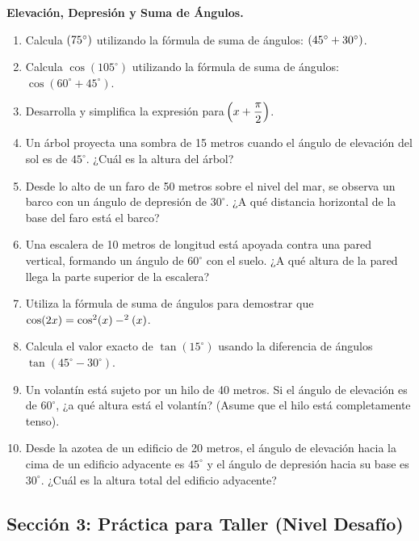 \documentclass[letterpaper, 12pt]{article}
\let\sin\relax
\DeclareMathOperator{\sin}{sen}
\begin{document}
\vspace{0.5cm}

\textbf{Elevación, Depresión y Suma de Ángulos.}
\begin{enumerate}[label=\textbf{\arabic*.}, leftmargin=*, itemsep=0.4cm, start=31]
    \item Calcula $\sin(75^\circ)$ utilizando la fórmula de suma de ángulos: $\sin(45^\circ + 30^\circ)$.
    \item Calcula $\cos(105^\circ)$ utilizando la fórmula de suma de ángulos: $\cos(60^\circ + 45^\circ)$.
    \item Desarrolla y simplifica la expresión para $\sin\!\left(x + \dfrac{\pi}{2}\right)$.
    \item Un árbol proyecta una sombra de 15 metros cuando el ángulo de elevación del sol es de $45^\circ$. ¿Cuál es la altura del árbol?
    \item Desde lo alto de un faro de 50 metros sobre el nivel del mar, se observa un barco con un ángulo de depresión de $30^\circ$. ¿A qué distancia horizontal de la base del faro está el barco?
    \item Una escalera de 10 metros de longitud está apoyada contra una pared vertical, formando un ángulo de $60^\circ$ con el suelo. ¿A qué altura de la pared llega la parte superior de la escalera?
    \item Utiliza la fórmula de suma de ángulos para demostrar que $\cos(2x) = \cos^2(x) - \sin^2(x)$.
    \item Calcula el valor exacto de $\tan(15^\circ)$ usando la diferencia de ángulos $\tan(45^\circ - 30^\circ)$.
    \item Un volantín está sujeto por un hilo de 40 metros. Si el ángulo de elevación es de $60^\circ$, ¿a qué altura está el volantín? (Asume que el hilo está completamente tenso).
    \item Desde la azotea de un edificio de 20 metros, el ángulo de elevación hacia la cima de un edificio adyacente es $45^\circ$ y el ángulo de depresión hacia su base es $30^\circ$. ¿Cuál es la altura total del edificio adyacente?
\end{enumerate}

\newpage

\subsection*{Sección 3: Práctica para Taller \normalfont\small(Nivel Desafío)}
\end{document}
